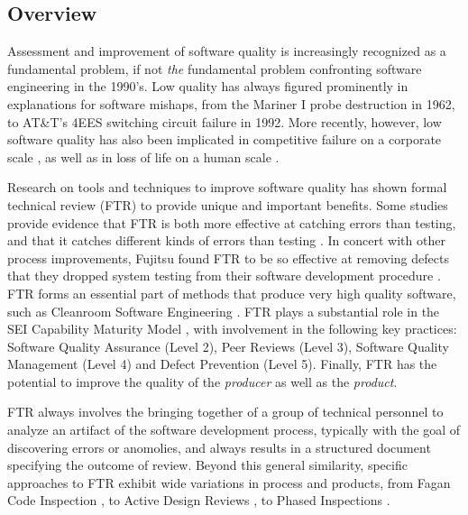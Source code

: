 
\subsection{Overview}

Assessment and improvement of software quality is increasingly recognized
as a fundamental problem, if not {\em the}\/ fundamental problem
confronting software engineering in the 1990's.  Low quality has always
figured prominently in explanations for software mishaps, from the Mariner
I probe destruction in 1962, to AT\&T's 4EES switching circuit failure in
1992.  More recently, however, low software quality has also been
implicated in competitive failure on a corporate scale \cite{Arthur93}, as
well as in loss of life on a human scale \cite{Leveson93}.

Research on tools and techniques to improve software quality has shown
formal technical review (FTR) to provide unique and important benefits.
Some studies provide evidence that FTR is both more effective at catching
errors than testing, and that it catches different kinds of errors than
testing \cite{Myers78,Basili86}.  In concert with other process
improvements, Fujitsu found FTR to be so effective at removing defects that
they dropped system testing from their software development procedure
\cite{Arthur93}.  FTR forms an essential part of methods that produce very
high quality software, such as Cleanroom Software Engineering
\cite{Linger93}.  FTR plays a substantial role in the SEI Capability
Maturity Model \cite{Paulk93a}, with involvement in the following key
practices: Software Quality Assurance (Level 2), Peer Reviews (Level 3),
Software Quality Management (Level 4) and Defect Prevention (Level 5).
Finally, FTR has the potential to improve the quality of the {\em producer}\/
as well as the {\em product}.


FTR always involves the bringing together of a group of technical personnel
to analyze an artifact of the software development process, typically with
the goal of discovering errors or anomolies, and always results in a
structured document specifying the outcome of review.  Beyond this general
similarity, specific approaches to FTR exhibit wide variations in process
and products, from Fagan Code Inspection \cite{Fagan76,Fagan86}, to Active
Design Reviews \cite{Parnas85}, to Phased Inspections \cite{Knight91}.

